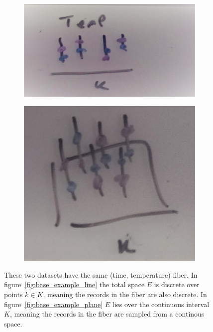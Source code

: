 \documentclass[../main.tex]{subfiles}
\begin{document}
\begin{figure}[ht!]
    \begin{subfigure}{.5\textwidth}
        \includegraphics[width=\textwidth]{figures/math/temp_1k.png}
        \caption{}
        \label{fig:base_example_discrete}
    \end{subfigure}
    \begin{subfigure}{.5\textwidth}
        \includegraphics[width=\textwidth]{figures/math/temp_2k.png}
        \caption{}
        \label{fig:base_example_continuous}
    \end{subfigure}
    \caption{These two datasets have the same (time, temperature) fiber. In figure~\ref{fig:base_example_line} the total space $E$ is discrete over points $k \in K$, meaning the records in the fiber are also discrete. In figure~\ref{fig:base_example_plane} $E$ lies over the continuous interval $K$, meaning the records in the fiber are sampled from a continous space. 
    }
    \label{fig:base_example}
\end{figure}
\end{document}
